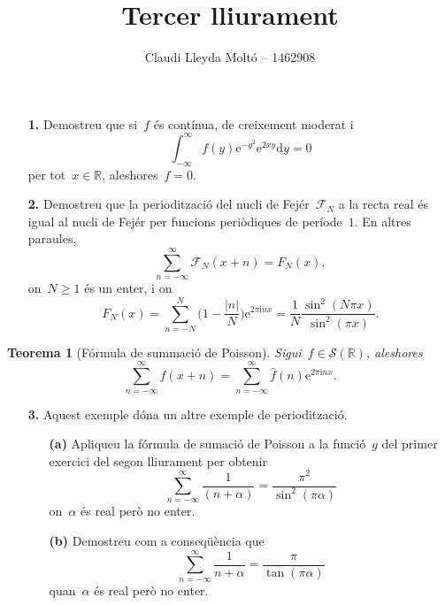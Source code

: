 \documentclass[a4paper]{article}
\title{Tercer lliurament}
\author{Claudi Lleyda Moltó -- 1462908}
\theoremstyle{plain}
\newtheorem{theorem}{Teorema}
\newcommand{\iu}{\mathrm{i}}
\newcommand{\e}{\mathrm{e}}
\providecommand{\uppi}{\pi}
\newcommand{\diff}{\mathrm{d}}
\newcommand{\abs}[1]{\lvert{#1}\rvert}
\newcommand{\F}{\mathcal{F}}
\begin{document}
\maketitle

\begin{enumerate}
    \item[\textbf{1.}] Demostreu que si~\(f\) és contínua, de creixement moderat
        i
        \[
            \int_{-\infty}^{\infty}f(y)\e^{-y^{2}}\e^{2xy}\diff y=0
        \]
        per tot~\(x\in\mathbb{R}\), aleshores~\(f=0\).
\end{enumerate}

\begin{enumerate}
    \item[\textbf{2.}] Demostreu que la periodització del nucli de
        Fejér~\(\F_{N}\) a la recta real és igual al nucli de Fejér per funcions
        periòdiques de període~\(1\).
        En altres paraules,
        \[
            \sum_{n=-\infty}^{\infty} \F_{N}(x+n)
            = F_{N}(x),
        \]
        on~\(N\geq1\) és un enter, i on
        \[
            F_{N}(x) = \sum_{n=-N}^{N} \biggl(1 - \frac{\abs{n}}{N}\biggr)
            \e^{2\uppi\iu nx}
            = \frac{1}{N}\frac{\sin^{2}(N\uppi x)}{\sin^{2}(\uppi x)}.
        \]
\end{enumerate}

\begin{theorem}[Fórmula de summació de Poisson]
    Sigui~\(f\in\mathcal{S}(\mathbb{R})\), aleshores
    \[
        \sum_{n=-\infty}^{\infty} f(x+n)
        = \sum_{n=-\infty}^{\infty} \widehat{f}(n) \e^{2\uppi\iu nx}.
    \]
\end{theorem}

\begin{enumerate}
    \item[\textbf{3.}] Aquest exemple dóna un altre exemple de periodització.
        \begin{enumerate}
            \item[\textbf{(a)}] Apliqueu la fórmula de sumació de Poisson a la
                funció~\(g\) del primer exercici del segon lliurament per
                obtenir
                \[
                    \sum_{n=-\infty}^{\infty} \frac{1}{(n+\alpha)}
                    = \frac{\uppi^{2}}{\sin^{2}(\uppi\alpha)}
                \]
                on~\(\alpha\) és real però no enter.
        \end{enumerate}
\end{enumerate}

\begin{enumerate}
    \item[]\begin{enumerate}
        \item[\textbf{(b)}] Demostreu com a conseqüència que
            \begin{equation}
                \label{eq3b}
                \sum_{n=-\infty}^{\infty} \frac{1}{n+\alpha}
                = \frac{\uppi}{\tan(\uppi\alpha)}
            \end{equation}
            quan~\(\alpha\) és real però no enter.
    \end{enumerate}
\end{enumerate}
\end{document}
